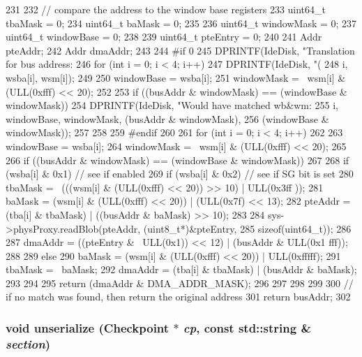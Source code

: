 \begin{DoxyCode}
231 {
232     // compare the address to the window base registers
233     uint64_t tbaMask = 0;
234     uint64_t baMask = 0;
235 
236     uint64_t windowMask = 0;
237     uint64_t windowBase = 0;
238 
239     uint64_t pteEntry = 0;
240 
241     Addr pteAddr;
242     Addr dmaAddr;
243 
244 #if 0
245     DPRINTF(IdeDisk, "Translation for bus address: %
246     for (int i = 0; i < 4; i++) {
247         DPRINTF(IdeDisk, "(%
248                 i, wsba[i], wsm[i]);
249 
250         windowBase = wsba[i];
251         windowMask = ~wsm[i] & (ULL(0xfff) << 20);
252 
253         if ((busAddr & windowMask) == (windowBase & windowMask)) {
254             DPRINTF(IdeDisk, "Would have matched %
      wb&wm:%
255                     i, windowBase, windowMask, (busAddr & windowMask),
256                     (windowBase & windowMask));
257         }
258     }
259 #endif
260 
261     for (int i = 0; i < 4; i++) {
262 
263         windowBase = wsba[i];
264         windowMask = ~wsm[i] & (ULL(0xfff) << 20);
265 
266         if ((busAddr & windowMask) == (windowBase & windowMask)) {
267 
268             if (wsba[i] & 0x1) {   // see if enabled
269                 if (wsba[i] & 0x2) { // see if SG bit is set
280                     tbaMask = ~(((wsm[i] & (ULL(0xfff) << 20)) >> 10) | ULL(0x3ff
      ));
281                     baMask = (wsm[i] & (ULL(0xfff) << 20)) | (ULL(0x7f) << 13);
282                     pteAddr = (tba[i] & tbaMask) | ((busAddr & baMask) >> 10);
283 
284                     sys->physProxy.readBlob(pteAddr, (uint8_t*)&pteEntry,
285                                             sizeof(uint64_t));
286 
287                     dmaAddr = ((pteEntry & ~ULL(0x1)) << 12) | (busAddr & ULL(0x1
      fff));
288 
289                 } else {
290                     baMask = (wsm[i] & (ULL(0xfff) << 20)) | ULL(0xfffff);
291                     tbaMask = ~baMask;
292                     dmaAddr = (tba[i] & tbaMask) | (busAddr & baMask);
293                 }
294 
295                 return (dmaAddr & DMA_ADDR_MASK);
296             }
297         }
298     }
299 
300     // if no match was found, then return the original address
301     return busAddr;
302 }
\end{DoxyCode}
\hypertarget{classMaltaPChip_af22e5d6d660b97db37003ac61ac4ee49}{
\subsubsection[{unserialize}]{\setlength{\rightskip}{0pt plus 5cm}void unserialize ({\bf Checkpoint} $\ast$ {\em cp}, \/  const std::string \& {\em section})}}
